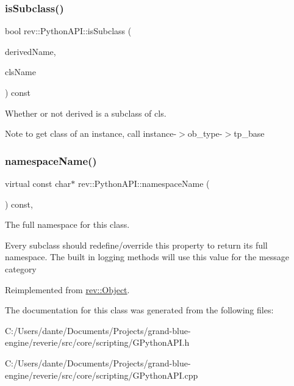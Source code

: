 \subsubsection{\texorpdfstring{isSubclass()}{isSubclass()}}
{\footnotesize\ttfamily bool rev\+::\+Python\+A\+P\+I\+::is\+Subclass (\begin{DoxyParamCaption}\item[{const \mbox{\hyperlink{classrev_1_1_g_string}{G\+String}} \&}]{derived\+Name,  }\item[{const \mbox{\hyperlink{classrev_1_1_g_string}{G\+String}} \&}]{cls\+Name }\end{DoxyParamCaption}) const}



Whether or not derived is a subclass of cls. 

\begin{DoxyNote}{Note}
to get class of an instance, call instance-\/$>$ob\+\_\+type-\/$>$tp\+\_\+base 
\end{DoxyNote}
\mbox{\label{classrev_1_1_python_a_p_i_ae8df4c3f4f00912cd2c184d79bfb31da}} 
\subsubsection{\texorpdfstring{namespaceName()}{namespaceName()}}
{\footnotesize\ttfamily virtual const char$\ast$ rev\+::\+Python\+A\+P\+I\+::namespace\+Name (\begin{DoxyParamCaption}{ }\end{DoxyParamCaption}) const\hspace{0.3cm}{\ttfamily [inline]}, {\ttfamily [virtual]}}



The full namespace for this class. 

Every subclass should redefine/override this property to return its full namespace. The built in logging methods will use this value for the message category 

Reimplemented from \mbox{\hyperlink{classrev_1_1_object_aaeb638d3e10f361c56c211a318a27f3d}{rev\+::\+Object}}.



The documentation for this class was generated from the following files\+:\begin{DoxyCompactItemize}
\item 
C\+:/\+Users/dante/\+Documents/\+Projects/grand-\/blue-\/engine/reverie/src/core/scripting/G\+Python\+A\+P\+I.\+h\item 
C\+:/\+Users/dante/\+Documents/\+Projects/grand-\/blue-\/engine/reverie/src/core/scripting/G\+Python\+A\+P\+I.\+cpp\end{DoxyCompactItemize}
